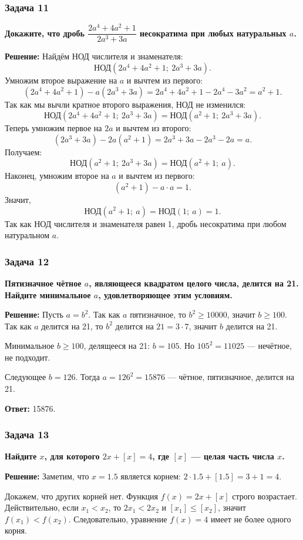 \documentclass[12pt, a4paper]{article}
\begin{document}
\subsubsection*{Задача 11}
\textbf{Докажите, что дробь $\dfrac{2a^4 + 4a^2 + 1}{2a^3 + 3a}$ несократима при любых натуральных $a$.}

\textbf{Решение:}
Найдём НОД числителя и знаменателя:
\[
\text{НОД}(2a^4 + 4a^2 + 1;\ 2a^3 + 3a).
\]
Умножим второе выражение на $a$ и вычтем из первого:
\[
(2a^4 + 4a^2 + 1) - a(2a^3 + 3a) = 2a^4 + 4a^2 + 1 - 2a^4 - 3a^2 = a^2 + 1.
\]
Так как мы вычли кратное второго выражения, НОД не изменился:
\[
\text{НОД}(2a^4 + 4a^2 + 1;\ 2a^3 + 3a) = \text{НОД}(a^2 + 1;\ 2a^3 + 3a).
\]
Теперь умножим первое на $2a$ и вычтем из второго:
\[
(2a^3 + 3a) - 2a(a^2 + 1) = 2a^3 + 3a - 2a^3 - 2a = a.
\]
Получаем:
\[
\text{НОД}(a^2 + 1;\ 2a^3 + 3a) = \text{НОД}(a^2 + 1;\ a).
\]
Наконец, умножим второе на $a$ и вычтем из первого:
\[
(a^2 + 1) - a \cdot a = 1.
\]
Значит,
\[
\text{НОД}(a^2 + 1;\ a) = \text{НОД}(1;\ a) = 1.
\]
Так как НОД числителя и знаменателя равен 1, дробь несократима при любом натуральном $a$.

\subsubsection*{Задача 12}
\textbf{Пятизначное чётное $a$, являющееся квадратом целого числа, делится на 21. Найдите минимальное $a$, удовлетворяющее этим условиям.}

\textbf{Решение:}
Пусть $a = b^2$. Так как $a$ пятизначное, то $b^2 \ge 10000$, значит $b \ge 100$. Так как $a$ делится на 21, то $b^2$ делится на $21 = 3 \cdot 7$, значит $b$ делится на 21.

Минимальное $b \ge 100$, делящееся на 21: $b = 105$. Но $105^2 = 11025$ — нечётное, не подходит.

Следующее $b = 126$. Тогда $a = 126^2 = 15876$ — чётное, пятизначное, делится на 21.

\textbf{Ответ:} 15876.

\subsubsection*{Задача 13}
\textbf{Найдите $x$, для которого $2x + [x] = 4$, где $[x]$ — целая часть числа $x$.}

\textbf{Решение:}
Заметим, что $x = 1.5$ является корнем: $2 \cdot 1.5 + [1.5] = 3 + 1 = 4$.

Докажем, что других корней нет. Функция $f(x) = 2x + [x]$ строго возрастает. Действительно, если $x_1 < x_2$, то $2x_1 < 2x_2$ и $[x_1] \le [x_2]$, значит $f(x_1) < f(x_2)$. Следовательно, уравнение $f(x) = 4$ имеет не более одного корня.
\end{document}
